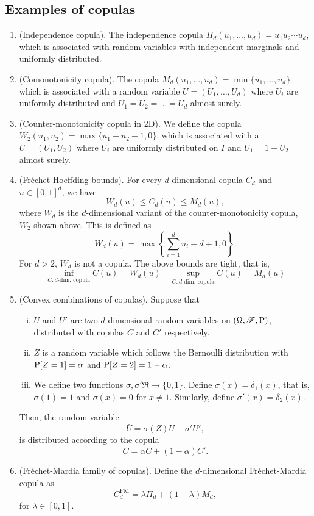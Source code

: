\documentclass[a4paper,10pt]{scrbook}
\begin{document}
\subsection{Examples of copulas}
\begin{enumerate}
 \item (Independence copula). The independence copula \(\Pi_d(u_1,\ldots, u_d) = 
       u_1 u_2 \cdots u_d\), which is associated with random variables with 
       independent marginals and uniformly distributed.
 \item (Comonotonicity copula). The copula \(M_d(u_1,\ldots, u_d) =
       \min\{u_1,\ldots, u_d\}\) which is associated with a random variable 
       \(U = (U_1, \ldots, U_d)\) where \(U_i\) are uniformly distributed 
       and \(U_1 = U_2 = \ldots = U_d\) almost surely. 
 \item (Counter-monotonicity copula in 2D). We define the copula \(W_2(u_1, u_2)= \max\{u_1+u_2-1, 0\}\),
       which is associated with a \(U = (U_1, U_2)\) where \(U_i\) are uniformly distributed on 
       \(I\) and \(U_1 = 1-U_2\) almost surely.
       
 \item (Fr\'echet-Hoeffding bounds). For every \(d\)-dimensional copula \(C_d\) and \(u\in[0,1]^d\),
       we have
       \[
        W_d(u) \leq C_d(u) \leq M_d(u),
       \]
       where \(W_d\) is the \(d\)-dimensional variant of the counter-monotonicity copula, \(W_2\)
       shown above. This is defined as 
       \[
        W_d(u) = \max\left\{\sum_{i=1}^{d}u_i - d + 1, 0\right\}.
       \]
       For \(d>2\), \(W_d\) is not a copula. The above bounds are tight, that is,
       \[
        \inf_{C: \text{$d$-dim. copula}} C(u) = W_d(u) \quad \sup_{C: \text{$d$-dim. copula}} C(u) = M_d(u)
       \]

 \item (Convex combinations of copulas). Suppose that 
 \begin{enumerate}[i.]
  \item \(U\) and \(U'\) are two \(d\)-dimensional random 
       variables on \((\Omega,\mathscr{F},\mathrm{P})\), distributed with copulas \(C\) and \(C'\) respectively.
  \item  \(Z\) is a random variable which follows the Bernoulli distribution with 
       \(\mathrm{P}[Z=1] = \alpha\) and \(\mathrm{P}[Z=2] = 1-\alpha\). 
  \item We define two functions \(\sigma, \sigma'\Re \to\{0,1\}\). 
        Define \(\sigma(x) = \delta_1(x)\), that is, \(\sigma(1) = 1\) and 
        \(\sigma(x) = 0\) for \(x\neq 1\). Similarly, define \(\sigma'(x) = \delta_2(x)\). 
 \end{enumerate}
Then, the random variable 
\[
 \bar{U} = \sigma(Z) U + \sigma' U',
\]
is distributed according to the copula 
\[
 \bar{C} = \alpha C + (1-\alpha) C'.
\]
  \item (Fr\'echet-Mardia family of copulas). Define the \(d\)-dimensional 
  Fr\'echet-Mardia copula as
  \[
   C_d^{\mathrm{FM}} = \lambda \Pi_d + (1-\lambda)M_d,
  \]
  for \(\lambda \in [0,1]\).


\end{enumerate}
\end{document}
